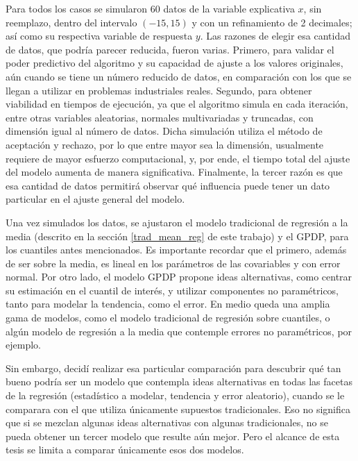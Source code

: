 Para todos los casos se simularon 60 datos de la variable explicativa $x$, sin reemplazo, dentro del intervalo $(-15,15)$ y con un refinamiento de 2 decimales; as\'i como su respectiva variable de respuesta $y$. Las razones de elegir esa cantidad de datos, que podr\'ia parecer reducida, fueron varias. Primero, para validar el poder predictivo del algoritmo y su capacidad de ajuste a los valores originales, aún cuando se tiene un n\'umero reducido de datos, en comparaci\'on con los que se llegan a utilizar en problemas industriales reales. Segundo, para obtener viabilidad en tiempos de ejecuci\'on, ya que el algoritmo simula en cada iteraci\'on, entre otras variables aleatorias, normales multivariadas y truncadas, con dimensi\'on igual al n\'umero de datos. Dicha simulaci\'on utiliza el m\'etodo de aceptaci\'on y rechazo, por lo que entre mayor sea la dimensi\'on, usualmente requiere de mayor esfuerzo computacional, y, por ende, el tiempo total del ajuste del modelo aumenta de manera significativa. Finalmente, la tercer raz\'on es que esa cantidad de datos permitir\'a observar qu\'e influencia puede tener un dato particular en el ajuste general del modelo.

Una vez simulados los datos, se ajustaron el modelo tradicional de regresi\'on a la media (descrito en la secci\'on \ref{trad_mean_reg} de este trabajo) y el GPDP, para los cuantiles antes mencionados. Es importante recordar que el primero, adem\'as de ser sobre la media, es lineal en los  par\'ametros de las covariables y con error normal. Por otro lado, el modelo GPDP propone ideas alternativas, como centrar su estimaci\'on en el cuantil de inter\'es, y utilizar componentes no param\'etricos, tanto para modelar la tendencia, como el error. En medio queda una amplia gama de modelos, como el modelo tradicional de regresi\'on sobre cuantiles, o alg\'un modelo de regresi\'on a la media que contemple errores no param\'etricos, por ejemplo. 

Sin embargo, decid\'i realizar esa particular comparaci\'on para descubrir qu\'e tan bueno podr\'ia ser un modelo que contempla ideas alternativas en todas las facetas de la regresi\'on (estad\'istico a modelar, tendencia y error aleatorio), cuando se le comparara con el que utiliza \'unicamente supuestos tradicionales. Eso no significa que si se mezclan algunas ideas alternativas con algunas tradicionales, no se pueda obtener un tercer modelo que resulte a\'un mejor. Pero el alcance de esta tesis se limita a comparar \'unicamente esos dos modelos.

